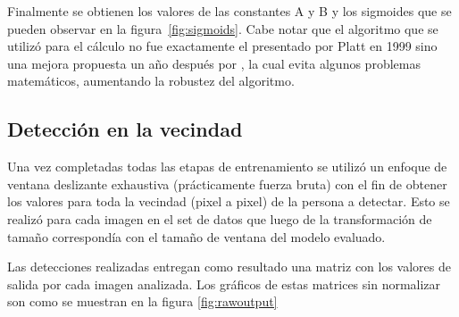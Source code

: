Finalmente se obtienen los valores de las constantes A y B y los sigmoides que se pueden observar en la figura~\ref{fig:sigmoids}. Cabe notar que el algoritmo que se utilizó para el cálculo no fue exactamente el presentado por Platt en 1999 sino una mejora propuesta un año después por \cite{Lin2000}, la cual evita algunos problemas matemáticos, aumentando la robustez del algoritmo.

\subsection{Detección en la vecindad}

Una vez completadas todas las etapas de entrenamiento se utilizó un enfoque de ventana deslizante exhaustiva (prácticamente fuerza bruta) con el fin de obtener los valores para toda la vecindad (pixel a pixel) de la persona a detectar. Esto se realizó para cada imagen en el set de datos que luego de la transformación de tamaño correspondía con el tamaño de ventana del modelo evaluado.  

Las detecciones realizadas entregan como resultado una matriz con los valores de salida por cada imagen analizada. Los gráficos de estas matrices sin normalizar son como se muestran en la figura \ref{fig:rawoutput} 

